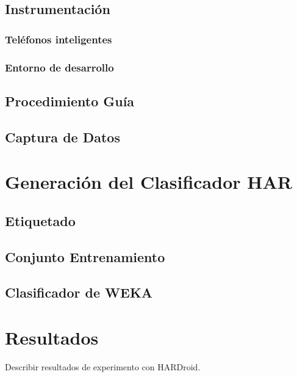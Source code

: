 \subsection{Instrumentación}

\subsubsection{Teléfonos inteligentes}

\subsubsection{Entorno de desarrollo }

\subsection{Procedimiento Guía }

\subsection{Captura de Datos}

\section{Generación del Clasificador HAR}

\label{sec6:clasificacion}

\subsection{Etiquetado}

\subsection{Conjunto Entrenamiento }

\subsection{Clasificador de WEKA}

\section{Resultados}

\label{sec6:resultados}Describir resultados de experimento con HARDroid.
